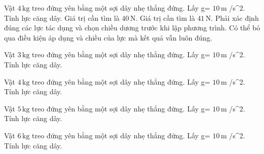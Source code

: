 \begin{ex}
Vật $4\,\text{kg}$ treo đứng yên bằng một sợi dây nhẹ thẳng đứng. Lấy g= $10\,\text{m}$ /s^2. Tính lực căng dây.
\choiceTF
{\True Giá trị cần tìm là $40\,\text{N}$.}
{Giá trị cần tìm là $41\,\text{N}$.}
{\True Phải xác định đúng các lực tác dụng và chọn chiều dương trước khi lập phương trình.}
{Có thể bỏ qua điều kiện áp dụng và chiều của lực mà kết quả vẫn luôn đúng.}
\end{ex}

\begin{ex}
Vật $3\,\text{kg}$ treo đứng yên bằng một sợi dây nhẹ thẳng đứng. Lấy g= $10\,\text{m}$ /s^2. Tính lực căng dây.
\end{ex}

\begin{ex}
Vật $4\,\text{kg}$ treo đứng yên bằng một sợi dây nhẹ thẳng đứng. Lấy g= $10\,\text{m}$ /s^2. Tính lực căng dây.
\end{ex}

\begin{ex}
Vật $5\,\text{kg}$ treo đứng yên bằng một sợi dây nhẹ thẳng đứng. Lấy g= $10\,\text{m}$ /s^2. Tính lực căng dây.
\end{ex}

\begin{ex}
Vật $6\,\text{kg}$ treo đứng yên bằng một sợi dây nhẹ thẳng đứng. Lấy g= $10\,\text{m}$ /s^2. Tính lực căng dây.
\end{ex}

